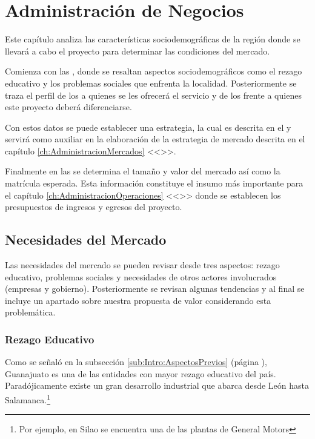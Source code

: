 \chapter{Administración de Negocios}
\label{ch:AdministracionNegocios}

Este capítulo analiza las características sociodemográficas de la región donde se llevará a cabo el proyecto para determinar las condiciones del mercado.

Comienza con las \emph{}, donde se resaltan aspectos sociodemográficos como el rezago educativo y los problemas sociales que enfrenta la localidad. Posteriormente se traza el perfil de los \emph{} a quienes se les ofrecerá el servicio y de los \emph{} frente a quienes este proyecto deberá diferenciarse.

Con estos datos se puede establecer una estrategia, la cual es descrita en el \emph{} y servirá como auxiliar en la elaboración de la estrategia de mercado descrita en el capítulo \ref{ch:AdministracionMercados} <<\emph{}>>.

Finalmente en las \emph{} se determina el tamaño y valor del mercado así como la matrícula esperada. Esta información constituye el insumo más importante para el capítulo \ref{ch:AdministracionOperaciones} <<\emph{}>> donde se establecen los presupuestos de ingresos y egresos del proyecto.

\section{Necesidades del Mercado}
\label{sec:Neg:NecesidadesMercado}

Las necesidades del mercado se pueden revisar desde tres aspectos: rezago educativo, problemas sociales y necesidades de otros actores involucrados (empresas y gobierno). Posteriormente se revisan algunas tendencias y al final se incluye un apartado sobre nuestra propuesta de valor considerando esta problemática.

\subsection{Rezago Educativo}

Como se señaló en la subsección \ref{sub:Intro:AspectosPrevios} (página \pageref{sub:Intro:AspectosPrevios}), Guanajuato es una de las entidades con mayor rezago educativo del país. Paradójicamente existe un gran desarrollo industrial que abarca desde León hasta Salamanca.\footnote{Por ejemplo, en Silao se encuentra una de las plantas de General Motors}

